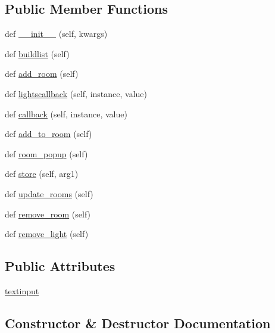 \subsection*{Public Member Functions}
\begin{DoxyCompactItemize}
\item 
def \hyperlink{classGUI8J_1_1LightsView_aa869b90f2eb911a68ef3e77eb3a6a82a}{\+\_\+\+\_\+init\+\_\+\+\_\+} (self, kwargs)
\item 
def \hyperlink{classGUI8J_1_1LightsView_a92d033a19bdb2038412ea15f49edf535}{buildlist} (self)
\item 
def \hyperlink{classGUI8J_1_1LightsView_a5ce2e25c5856187c98420e319c5fca7f}{add\+\_\+room} (self)
\item 
def \hyperlink{classGUI8J_1_1LightsView_ad6ba3cded3ba2e6bf1da130625544a5c}{lightscallback} (self, instance, value)
\item 
def \hyperlink{classGUI8J_1_1LightsView_a45a9730f55978a8fc4c452dfa583332d}{callback} (self, instance, value)
\item 
def \hyperlink{classGUI8J_1_1LightsView_ac3ed1b51f74c502b2fd9ad7c36d3dcbd}{add\+\_\+to\+\_\+room} (self)
\item 
def \hyperlink{classGUI8J_1_1LightsView_ac4e2881bc3e4ce75ddf8b1937722974e}{room\+\_\+popup} (self)
\item 
def \hyperlink{classGUI8J_1_1LightsView_a829d96000de9fe0044acd685e005af0d}{store} (self, arg1)
\item 
def \hyperlink{classGUI8J_1_1LightsView_a6bb6e91505cef521592ecc5e231ca893}{update\+\_\+rooms} (self)
\item 
def \hyperlink{classGUI8J_1_1LightsView_addfb70b9f5e33de1f69d5b8880ad741f}{remove\+\_\+room} (self)
\item 
def \hyperlink{classGUI8J_1_1LightsView_a1a3f0a8522cfbe99e38330c862bacbad}{remove\+\_\+light} (self)
\end{DoxyCompactItemize}
\subsection*{Public Attributes}
\begin{DoxyCompactItemize}
\item 
\hyperlink{classGUI8J_1_1LightsView_ae46a41876c688b387ead511b3bf4e780}{textinput}
\end{DoxyCompactItemize}


\subsection{Constructor \& Destructor Documentation}
